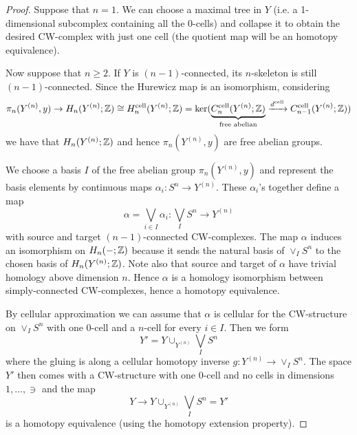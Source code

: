 \begin{proof}
Suppose that $n=1$. We can choose a maximal tree in $Y$ (i.e. a 1-dimensional subcomplex containing all the $0$-cells) and collapse it to obtain the desired CW-complex with just one cell (the quotient map will be an homotopy equivalence).

Now suppose that $n\ge2$. If $Y$ is $(n-1)$-connected, its $n$-skeleton is still $(n-1)$-connected. Since the Hurewicz map is an isomorphism, considering
\[\pi_n(Y^{(n)},y)\to H_n(Y^{(n)};{\mathbb Z})\cong H^\text{cell}_n(Y^{(n)};{\mathbb Z})=\ker(\underbrace{C^\text{cell}_n(Y^{(n)};{\mathbb Z})}_{\text{free abelian}}\xrightarrow{d^\text{cell}}C^\text{cell}_{n-1}(Y^{(n)};{\mathbb Z}))\]
we have that $H_n(Y^{(n)};{\mathbb Z})$ and hence $\pi_n(Y^{(n)},y)$ are free abelian groups.

We choose a basis $I$ of the free abelian group $\pi_n(Y^{(n)},y)$ and represent the basis elements by continuous maps $\alpha_i:S^n\to Y^{(n)}$. These $\alpha_i$'s together define a map
\[\alpha=\bigvee_{i\in I}\alpha_i:\bigvee_I S^n\to Y^{(n)}\]
with source and target $(n-1)$-connected CW-complexes. The map $\alpha$ induces an isomorphism on $H_n(-;{\mathbb Z})$ because it sends the natural basis of $\vee_I S^n$ to the chosen basis of $H_n(Y^{(n)};{\mathbb Z})$. Note also that source and target of $\alpha$ have trivial homology above dimension $n$. Hence $\alpha$ is a homology isomorphism between simply-connected CW-complexes, hence a homotopy equivalence.

By cellular approximation we can assume that $\alpha$ is cellular for the CW-structure on $\vee_I S^n$ with one $0$-cell and a $n$-cell for every $i\in I$. Then we form
\[Y'=Y\cup_{Y^{(n)}}\bigvee_I S^n\]
where the gluing is along a cellular homotopy inverse $g:Y^{(n)}\to \vee_I S^n$. The space $Y'$ then comes with a CW-structure with one $0$-cell and no cells in dimensions $1,\dots,\ni$ and the map
\[Y\to Y\cup_{Y^{(n)}}\bigvee_I S^n=Y'\]
is a homotopy equivalence (using the homotopy extension property).
\end{proof}
